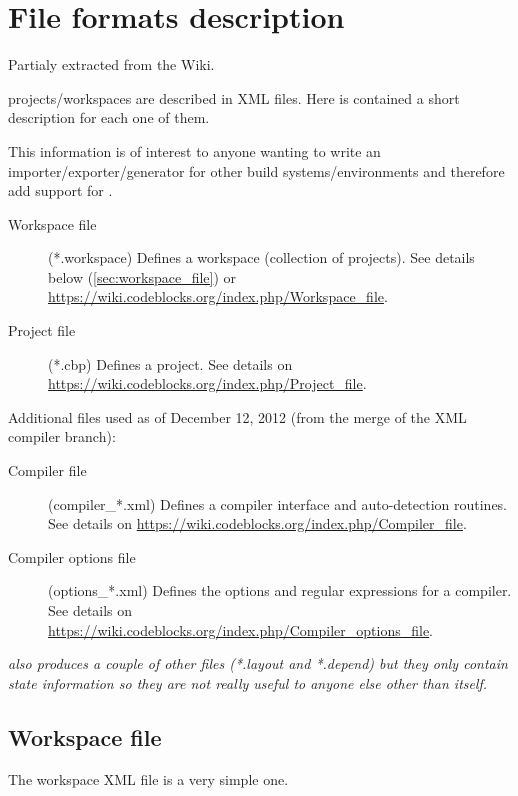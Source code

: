 \section{File formats description}\label{sec:file_formats}

Partialy extracted from the Wiki.

\codeblocks projects/workspaces are described in XML files. Here is contained a short description for each one of them.

This information is of interest to anyone wanting to write an importer/exporter/generator for other build systems/environments and therefore add support for \codeblocks.

\begin{description}
\item[Workspace file] (*.workspace) Defines a \codeblocks workspace (collection of projects). See details below (\ref{sec:workspace_file}) or \url{https://wiki.codeblocks.org/index.php/Workspace_file}.
\item[Project file] (*.cbp) Defines a \codeblocks project. See details on \url{https://wiki.codeblocks.org/index.php/Project_file}.
\end{description}

Additional files used as of December 12, 2012 (from the merge of the XML compiler branch):

\begin{description}
\item[Compiler file] (compiler\_*.xml) Defines a \codeblocks compiler interface and auto-detection routines. See details on \url{https://wiki.codeblocks.org/index.php/Compiler_file}.
\item[Compiler options file] (options\_*.xml) Defines the options and regular expressions for a \codeblocks compiler. See details on \url{https://wiki.codeblocks.org/index.php/Compiler_options_file}.
\end{description}

\textit{\codeblocks also produces a couple of other files (*.layout and *.depend) but they only contain state information so they are not really useful to anyone else other than \codeblocks itself.}

\subsection*{Workspace file}\label{sec:workspace_file}

The workspace XML file is a very simple one.

